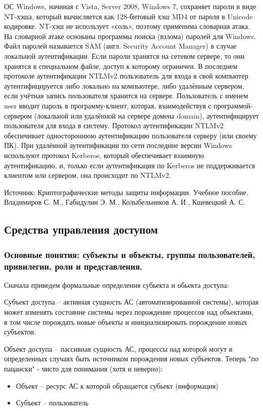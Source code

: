 ОС Windows, начиная с Vista, Server 2008, Windows 7, сохраняет пароли в виде NT-хэша, который вычисляется как 128-битовый хэш MD4 от пароля в Unicode кодировке. NT-хэш не использует «соль», поэтому применима словарная атака. На словарной атаке основаны программы поиска (взлома) паролей для Windows. Файл паролей называется SAM (англ. Security Account Manager) в случае локальной аутентификации. Если пароли хранятся на сетевом сервере, то они хранятся в специальном файле, доступ к которому ограничен.
В последнем протоколе аутентификации NTLMv2 пользователь для входа в свой компьютер аутентифицируется либо локально на компьютере, либо удалённым сервером, если учётная запись пользователя хранится на сервере.
Пользователь с именем user вводит пароль в программу-клиент, которая, взаимодействуя с программой-сервером (локальной или удалённой на сервере домена domain), аутентифицирует пользователя для входа в систему.
Протокол аутентификации NTLMv2 обеспечивает одностороннюю аутентификацию пользователя серверу (или своему ПК).
При удалённой аутентификации по сети последние версии Windows используют протокол Kerberos, который обеспечивает взаимную аутентификацию, и, только если аутентификация по Kerberos не поддерживается клиентом или сервером, она происходит по NTLMv2.

Источник: Криптографические методы защиты информации. Учебное пособие. Владимиров С. М., Габидулин Э. М., Колыбельников А. И., Кшевецкий А. С.

\subsection{Средства управления доступом}
\subsubsection{Основные понятия: субъекты и объекты, группы пользователей, привилегии, роли и представления.}
Сначала приведем формальные определения субьекта и обьекта доступа:

Субъект доступа – активная сущность АС (автоматизированной системы), которая может изменять состояние системы через порождение процессов над объектами, в том числе порождать новые объекты и инициализировать порождение новых субъектов.

Объект доступа – пассивная сущность АС, процессы над которой могут в определенных случаях быть источником порождения новых субъектов.
Теперь "по пацански" - чисто для понимания (хотя и неверно):
\begin{itemize}
    \item Объект – ресурс АС к которой обращается субьект (информация)
    \item Субъект – пользователь
\end{itemize}

